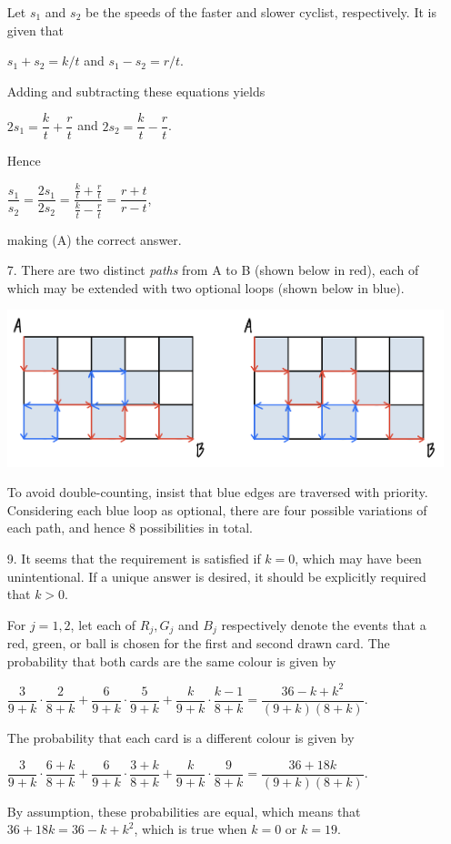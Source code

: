\documentclass[11pt,fleqn,dvipsnames,usenames]{article}
\begin{document}
\begin{enumerate}
Let $s_{1}$ and $s_{2}$ be the speeds of the faster and slower cyclist, respectively.  It is given that
\begin{center}
$s_{1} + s_{2} = k/t$ and $s_{1} - s_{2} = r/t$.
\end{center}
Adding and subtracting these equations yields
\begin{center}
$2s_{1} = \dfrac{k}{t} + \dfrac{r}{t}$ and $2s_{2} = \dfrac{k}{t} - \dfrac{r}{t}$.
\end{center}
Hence
\begin{center}
$\dfrac{s_{1}}{s_{2}} = \dfrac{2s_{1}}{2s_{2}} = \dfrac{\frac{k}{t} + \frac{r}{t}}{\frac{k}{t} - \frac{r}{t}} = \dfrac{r+t}{r-t}$,
\end{center}
making (A) the correct answer.

\item[7.] There are two distinct \emph{paths} from A to B (shown below in red), each of which may be extended with two optional loops (shown below in blue).
\begin{center}
\includegraphics[width=0.8\linewidth]{routes}
\end{center}
To avoid double-counting, insist that blue edges are traversed with priority.  Considering each blue loop as optional, there are four possible variations of each path, and hence 8 possibilities in total.

\item[9.] \note It seems that the requirement is satisfied if $k=0$, which may have been unintentional.  If a unique answer is desired, it should be explicitly required that $k>0$.

For $j=1,2$, let each of $R_{j}, G_{j}$ and $B_{j}$ respectively denote the events that a red, green, or ball is chosen for the first and second drawn card.  The probability that both cards are the same colour is given by
\begin{center}
$\dfrac{3}{9+k}\cdot\dfrac{2}{8 + k} + \dfrac{6}{9+k}\cdot\dfrac{5}{9+k} + \dfrac{k}{9+k}\cdot\dfrac{k-1}{8+k} = \dfrac{36 - k + k^2}{(9+k)(8+k)}$.
\end{center}
%
The probability that each card is a different colour is given by
\begin{center}
$\dfrac{3}{9+k}\cdot \dfrac{6+k}{8+k} + \dfrac{6}{9+k}\cdot \dfrac{3+k}{8+k} + \dfrac{k}{9+k}\cdot \dfrac{9}{8+k} = \dfrac{36 + 18k}{(9+k)(8+k)}$.
\end{center}
By assumption, these probabilities are equal, which means that $36 + 18k = 36 - k + k^2$, which is true when $k = 0$ or $k=19$.


\end{enumerate}
\end{document}
